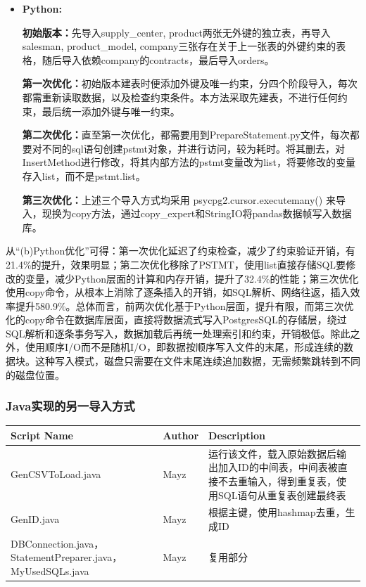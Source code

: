 \documentclass[11pt]{article}
\begin{document}
\begin{itemize}
\item \textbf{Python:} \par
\hspace{-2em}\textbf{初始版本：}先导入supply\_center, product两张无外键的独立表，再导入salesman, product\_model, company三张存在关于上一张表的外键约束的表格，随后导入依赖company的contracts，最后导入orders。\par
\hspace{-2em}\textbf{第一次优化：}初始版本建表时便添加外键及唯一约束，分四个阶段导入，每次都需重新读取数据，以及检查约束条件。本方法采取先建表，不进行任何约束，最后统一添加外键与唯一约束。\par
\hspace{-2em}\textbf{第二次优化：}直至第一次优化，都需要用到PrepareStatement.py文件，每次都要对不同的sql语句创建pstmt对象，并进行访问，较为耗时。将其删去，对InsertMethod进行修改，将其内部方法的pstmt变量改为list，将要修改的变量存入list，而不是pstmt.list。\par
\hspace{-2em}\textbf{第三次优化：}上述三个导入方式均采用 psycpg2.cursor.executemany() 来导入，现换为copy方法，通过copy\_expert和StringIO将pandas数据帧写入数据库。\par
\end{itemize}

从“(b)Python优化”可得：第一次优化延迟了约束检查，减少了约束验证开销，有21.4\%的提升，效果明显；第二次优化移除了PSTMT，使用list直接存储SQL要修改的变量，减少Python层面的计算和内存开销，提升了32.4\%的性能；第三次优化使用copy命令，从根本上消除了逐条插入的开销，如SQL解析、网络往返，插入效率提升580.9\%。总体而言，前两次优化基于Python层面，提升有限，而第三次优化的copy命令在数据库层面，直接将数据流式写入PostgresSQL的存储层，绕过SQL解析和逐条事务写入，数据加载后再统一处理索引和约束，开销极低。除此之外，使用顺序I/O而不是随机I/O，即数据按顺序写入文件的末尾，形成连续的数据块。这种写入模式，磁盘只需要在文件末尾连续追加数据，无需频繁跳转到不同的磁盘位置。


\subsubsection{Java实现的另一导入方式}
\begin{table}[H]
  \centering
  \label{tab:customer_info}
  \renewcommand{\arraystretch}{1} %
  \begin{tabular}{@{} >{\centering\arraybackslash}m{4cm} >{\centering\arraybackslash}m{1.5cm}>{\centering\arraybackslash}m{10cm} @{}}
    \toprule
    \textbf{Script Name} & \textbf{Author} & \textbf{Description} \\
    \midrule
    GenCSVToLoad.java & Mayz & 运行该文件，载入原始数据后输出加入ID的中间表，中间表被直接不去重输入，得到重复表，使用SQL语句从重复表创建最终表\\
    \midrule
    GenID.java & Mayz & 根据主键，使用hashmap去重，生成ID\\
    \midrule
    DBConnection.java，StatementPreparer.java，MyUsedSQLs.java & Mayz & 复用部分\\
    \bottomrule
  \end{tabular}
\end{table}
\end{document}
